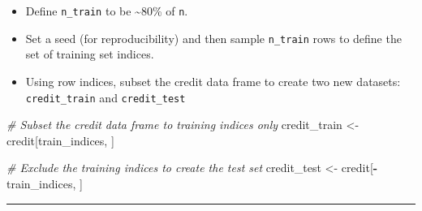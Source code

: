 \documentclass[
]{book}
\newenvironment{Shaded}{\begin{snugshade}}{\end{snugshade}}
\newcommand{\CommentTok}[1]{\textcolor[rgb]{0.56,0.35,0.01}{\textit{#1}}}
\newcommand{\DecValTok}[1]{\textcolor[rgb]{0.00,0.00,0.81}{#1}}
\newcommand{\KeywordTok}[1]{\textcolor[rgb]{0.13,0.29,0.53}{\textbf{#1}}}
\newcommand{\NormalTok}[1]{#1}
\newcommand{\OperatorTok}[1]{\textcolor[rgb]{0.81,0.36,0.00}{\textbf{#1}}}
\newcommand{\StringTok}[1]{\textcolor[rgb]{0.31,0.60,0.02}{#1}}
\providecommand{\tightlist}{%
  \setlength{\itemsep}{0pt}\setlength{\parskip}{0pt}}
\begin{document}
\begin{itemize}
\tightlist
\item
  Define \texttt{n\_train} to be \textasciitilde80\% of \texttt{n}.
\end{itemize}

\begin{Shaded}
\end{Shaded}

\begin{itemize}
\tightlist
\item
  Set a seed (for reproducibility) and then sample \texttt{n\_train} rows to define the set of training set indices.
\end{itemize}

\begin{Shaded}
\end{Shaded}

\begin{itemize}
\tightlist
\item
  Using row indices, subset the credit data frame to create two new datasets: \texttt{credit\_train} and \texttt{credit\_test}
\end{itemize}

\begin{Shaded}
\begin{Highlighting}[]
\CommentTok{# Subset the credit data frame to training indices only}
\NormalTok{credit_train <-}\StringTok{ }\NormalTok{credit[train_indices, ]  }
  
\CommentTok{# Exclude the training indices to create the test set}
\NormalTok{credit_test <-}\StringTok{ }\NormalTok{credit[}\OperatorTok{-}\NormalTok{train_indices, ]}
\end{Highlighting}
\end{Shaded}

\begin{center}\rule{0.5\linewidth}{0.5pt}\end{center}
\end{document}
